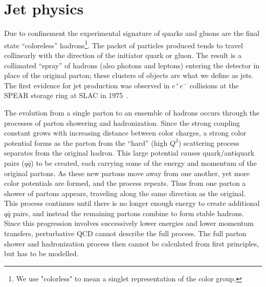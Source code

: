 \section{Jet physics}\label{sec:jets}

Due to confinement the experimental signature of quarks and gluons are the final state ``coloreless'' hadrons\footnote{We use "colorless" to mean a singlet representation of the color group.}.  The packet of particles produced tends to travel collinearly with the direction of the initiator quark or gluon. The result is a collimated ``spray'' of hadrons (also photons and leptons) entering the detector in place of the original parton; these clusters of objects are what we define as jets.
The first evidence for jet production was observed in $e^+e^-$ collisions at the SPEAR storage ring at SLAC in 1975~\cite{PhysRevLett.35.1609}. 


The evolution from a single parton to an ensemble of hadrons occurs through the processes of parton showering and hadronization. Since the strong coupling constant grows with increasing distance between color charges, a strong color potential forms as the parton from the ``hard'' (high $Q^2$) scattering process separates from the original hadron. This large potential causes quark$/$antiquark pairs ($q\bar{q}$) to be created, each carrying some of the energy and momentum of the original partons. As these new partons move away from one another, yet more color potentials are formed, and the process repeats. Thus from one parton a shower of partons appears, traveling along the same direction as the original.  This process continues until there is no longer enough energy to create additional $q\bar{q}$ pairs, and instead the remaining partons combine to form stable hadrons. Since this progression involves successively lower energies and lower momentum transfers, perturbative QCD cannot describe the full process.  The full parton shower and hadronization process then cannot be calculated from first principles, but has to be modelled.


